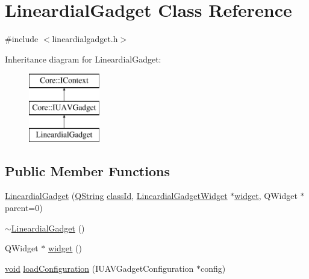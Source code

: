\hypertarget{class_lineardial_gadget}{\section{\-Lineardial\-Gadget \-Class \-Reference}
\label{class_lineardial_gadget}
}


{\ttfamily \#include $<$lineardialgadget.\-h$>$}

\-Inheritance diagram for \-Lineardial\-Gadget\-:\begin{figure}[H]
\begin{center}
\leavevmode
\includegraphics[height=3.000000cm]{class_lineardial_gadget}
\end{center}
\end{figure}
\subsection*{\-Public \-Member \-Functions}
\begin{DoxyCompactItemize}
\item 
\hyperlink{group___linear_dial_plugin_gae00c0aad0b87c017df5b0305d6fb1c5b}{\-Lineardial\-Gadget} (\hyperlink{group___u_a_v_objects_plugin_gab9d252f49c333c94a72f97ce3105a32d}{\-Q\-String} \hyperlink{group___core_plugin_ga3878fde66a57220608960bcc3fbeef2c}{class\-Id}, \hyperlink{class_lineardial_gadget_widget}{\-Lineardial\-Gadget\-Widget} $\ast$\hyperlink{group___linear_dial_plugin_ga65e61a0bf52e2ab9b2fe4ba7e3ae3b96}{widget}, \-Q\-Widget $\ast$parent=0)
\item 
\hyperlink{group___linear_dial_plugin_gaee31b5207ca412de6722401f392a8fd0}{$\sim$\-Lineardial\-Gadget} ()
\item 
\-Q\-Widget $\ast$ \hyperlink{group___linear_dial_plugin_ga65e61a0bf52e2ab9b2fe4ba7e3ae3b96}{widget} ()
\item 
\hyperlink{group___u_a_v_objects_plugin_ga444cf2ff3f0ecbe028adce838d373f5c}{void} \hyperlink{group___linear_dial_plugin_ga6bdccc9d4347fd8f04ea5e893877a30f}{load\-Configuration} (\-I\-U\-A\-V\-Gadget\-Configuration $\ast$config)
\end{DoxyCompactItemize}


